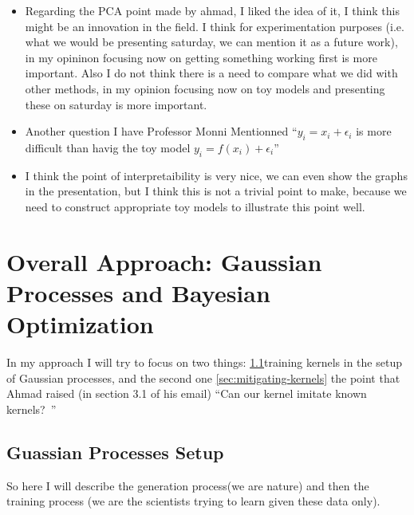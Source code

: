 \documentclass[12pt]{article}
\begin{document}
\begin{itemize}
K(i,j)=K(i,j)+epsilon for all i, j need not lift the eigenvalues from zero to positive.'' I noticed that numerically it is true, but why is true mathematically? I would like to understand this point better. I understood adding a jitter but why only on the diagonal?
  \item Regarding the PCA point made by ahmad, I liked the idea of it, I think this might be an innovation in the field. I think for experimentation purposes (i.e. what we would be presenting saturday, we can mention it as a future work), in my opininon focusing now on getting something working first is more important. Also I do not think there is a need to compare what we did with other methods, in my opinion focusing now on toy models and presenting these on saturday is more important. 
  \item Another question I have Professor Monni Mentionned ``$y_i=x_i + \epsilon_i$ is more difficult than havig the toy model $y_i = f(x_i) + \epsilon_i$''
  \item I think the point of interpretaibility is very nice, we can even show the graphs in the presentation, but I think this is not a trivial point to make, because we need to construct appropriate toy models to illustrate this point well. 
\end{itemize}

\section{Overall Approach: Gaussian Processes and Bayesian Optimization}
\label{sec:approach}
In my approach I will try to focus on two things: \ref{sec:gp-setup}training kernels in the setup of Gaussian processes, and the second one \ref{sec:mitigating-kernels} the point that Ahmad raised (in section 3.1 of his email) ``Can our kernel imitate known kernels? ''
\subsection{Guassian Processes Setup}
\label{sec:gp-setup}
So here I will describe the generation process(we are nature) and then the training process (we are the scientists trying to learn given these data only).
\end{document}
